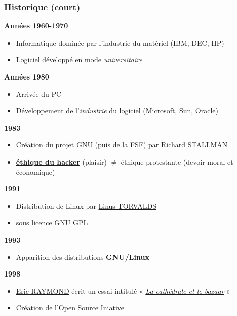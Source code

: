 \documentclass[10pt]{beamer}
\begin{document}

\begin{frame}
  \frametitle{Historique (court)}

  \textbf{Années 1960-1970}

  \begin{itemize}
  \item Informatique dominée par l'industrie du matériel \hfill (IBM, DEC, HP)
  \item Logiciel développé en mode \emph{universitaire}
  \end{itemize}

  \vfill

  \textbf{Années 1980}

  \begin{itemize}
  \item Arrivée du PC
  \item Développement de l'\emph{industrie} du logiciel \hfill (Microsoft, Sun, Oracle)
  \end{itemize}

  \vfill

  \textbf{1983}

  \begin{itemize}
  \item Création du projet \href{http://www.gnu.org}{GNU} (puis de la \href{http://www.fsf.org}{FSF}) par \href{http://stallman.org}{Richard STALLMAN}
  \item \textbf{\href{https://fr.wikipedia.org/wiki/L\%27\%C3\%A9thique_hacker}{éthique du hacker}} (plaisir) $\neq$ éthique protestante (devoir moral et économique)
  \end{itemize}

  \vfill  

  \textbf{1991}

  \begin{itemize}
  \item Distribution de Linux par \href{https://fr.wikipedia.org/wiki/Linus_Torvalds}{Linus TORVALDS}
  \item sous licence GNU GPL
  \end{itemize}

  \textbf{1993}
  \begin{itemize}
  \item Apparition des distributions \textbf{GNU/Linux}
  \end{itemize}

  \textbf{1998}
  \begin{itemize}
  \item \href{http://www.catb.org/esr}{Eric RAYMOND} écrit un essai intitulé « \emph{\href{http://www.linux-france.org/article/these/cathedrale-bazar/cathedrale-bazar.html}{La cathédrale et le bazaar}} »
  \item Création de l'\href{http://opensource.org}{Open Source Iniative}
  \end{itemize}
\end{frame}
\end{document}

